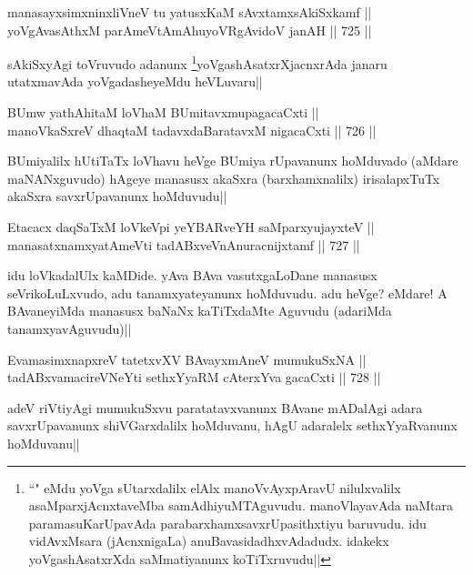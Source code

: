 \begin{shl}
manasayxsimxninxliVneV tu yatusxKaM sAvxtamxsAkiSxkamf || \\
yoVgAvasAthxM parAmeVtAmAhuyoVRgAvidoV janAH ||  725 ||  
\end{shl}

\begin{artha} 
sAkiSxyAgi toVruvudo adanunx \footnote[1]{``\stext" eMdu yoVga 
sUtarxdalilx elAlx manoVvAyxpAravU nilulxvalilx asaMparxjAcnxtaveMba 
samAdhiyuMTAguvudu. manoVlayavAda naMtara paramasuKarUpavAda 
parabarxhamxsavxrUpasithxtiyu baruvudu. idu vidAvxMsara (jAcnxnigaLa) 
anuBavasidadhxvAdadudx. idakekx yoVgashAsatxrXda saMmatiyanunx 
koTiTxruvudu||}yoVgashAsatxrXjacnxrAda 
janaru utatxmavAda yoVgadasheyeMdu heVLuvaru||
\end{artha}

\begin{shl}
BUmw yathA\s \s hitaM loVhaM BUmitavxmupagacaCxti || \\
manoV\s kaSxreV dhaqtaM tadavxdaBaratavxM nigacaCxti ||  726 ||  
\end{shl}

\begin{artha} 
BUmiyalilx hUtiTaTx loVhavu heVge BUmiya rUpavanunx hoMduvado (aMdare 
maNANxguvudo) hAgeye manasusx akaSxra (barxhamxnalilx) irisalapxTuTx 
akaSxra savxrUpavanunx hoMduvudu||
\end{artha}

\begin{shl}
Etacacx daqSaTxM loVkeV\s pi yeYBARveYH saMparxyujayxteV || \\
manasatxnamxyatAmeVti tadABxveVnAnuracnijxtamf ||  727 ||  
\end{shl}

\begin{artha} 
idu loVkadalUlx kaMDide. yAva BAva vasutxgaLoDane manasusx 
seVrikoLuLxvudo, adu tanamxyateyanunx hoMduvudu. adu heVge? eMdare! A 
BAvaneyiMda manasusx baNaNx kaTiTxdaMte Aguvudu (adariMda 
tanamxyavAguvudu)||
\end{artha}

\begin{shl}
EvamasimxnapxreV tatetxvXV BAvayxmAneV mumukuSxNA || \\
tadABxvamacireVNeYti sethxYyaRM cAterxYva gacaCxti ||  728 ||  
\end{shl}

\begin{artha} 
adeV riVtiyAgi mumukuSxvu paratatavxvanunx BAvane mADalAgi adara 
savxrUpavanunx shiVGarxdalilx hoMduvanu, hAgU adaralelx 
sethxYyaRvanunx hoMduvanu||
\end{artha}

